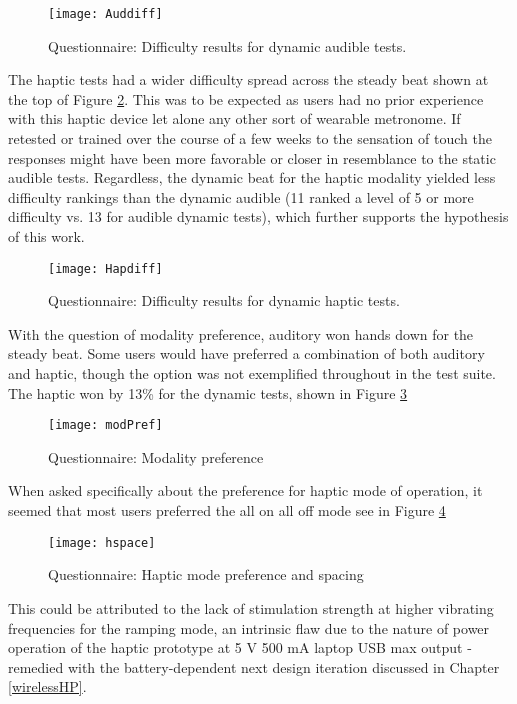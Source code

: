 \begin{figure}[H]
    \centering
    \texttt{[image: Auddiff]}
    \caption{Questionnaire: Difficulty results for dynamic audible tests.}
    \label{fig:Auddiff}
\end{figure}

The haptic tests had a wider difficulty spread across the steady beat shown at the top of Figure \ref{fig:Hapdiff}. This was to be expected as users had no prior experience with this haptic device let alone any other sort of wearable metronome. If retested or trained over the course of a few weeks to the sensation of touch the responses might have been more favorable or closer in resemblance to the static audible tests. Regardless, the dynamic beat for the haptic modality yielded less difficulty rankings than the dynamic audible (11 ranked a level of 5 or more difficulty vs. 13 for audible dynamic tests), which further supports the hypothesis of this work.
\begin{figure}[H]
    \centering
    \texttt{[image: Hapdiff]}
    \caption{Questionnaire: Difficulty results for dynamic haptic tests.}
    \label{fig:Hapdiff}
\end{figure}

With the question of modality preference, auditory won hands down for the steady beat. Some users would have preferred a combination of both auditory and haptic, though the option was not exemplified throughout in the test suite. The haptic won by 13\% for the dynamic tests, shown in Figure \ref{fig:modPref}
\begin{figure}[H]
    \centering
    \texttt{[image: modPref]}
    \caption{Questionnaire: Modality preference}
    \label{fig:modPref}
\end{figure}

When asked specifically about the preference for haptic mode of operation, it seemed that most users preferred the all on all off mode see in Figure \ref{fig:hspace}
\begin{figure}[H]
    \centering
    \texttt{[image: hspace]}
    \caption{Questionnaire: Haptic mode preference and spacing}
    \label{fig:hspace}
\end{figure}

This could be attributed to the lack of stimulation strength at higher vibrating frequencies for the ramping mode, an intrinsic flaw due to the nature of power operation of the haptic prototype at 5 V 500 mA laptop USB max output - remedied with the battery-dependent next design iteration discussed in Chapter \ref{wirelessHP}. 

